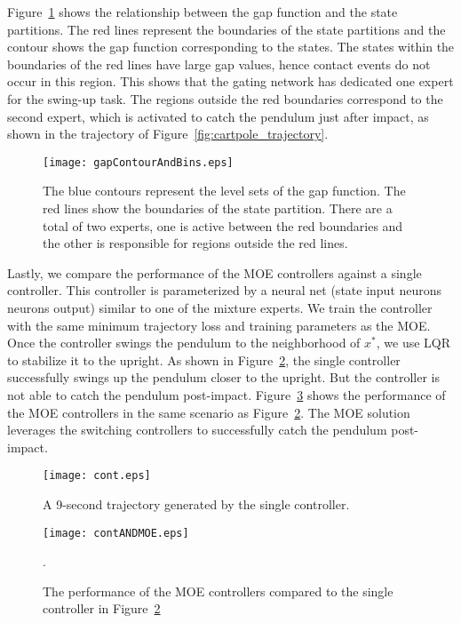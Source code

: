 Figure~\ref{fig:gapContour} shows the relationship between the gap function and the state partitions.
%
The red lines represent the boundaries of the state partitions and the contour
shows the gap function corresponding to the states.
%
The states within the boundaries of the red lines have large gap values, hence
contact events do not occur in this region.
%
This shows that the gating network has dedicated one expert for the swing-up
task.
%
The regions outside the red boundaries correspond to the second expert, which is
activated to catch the pendulum just after impact, as shown in the trajectory of
Figure~\ref{fig:cartpole_trajectory}.


\begin{figure}[H]
    \centering
    \texttt{[image: gapContourAndBins.eps]}
    \caption{The blue contours represent the level sets of the gap function. The red lines show the boundaries of the state partition. There are a total of two experts, one is active between the red boundaries and the other is responsible for regions outside the red lines.}
    \label{fig:gapContour}
\end{figure}


Lastly, we compare the performance of the MOE controllers against a single controller.
%
This controller is parameterized by a neural net (state input 
neurons  neurons  output) similar to one of the
mixture experts.
%
We train the controller with the same minimum trajectory loss and training
parameters as the MOE.
%
Once the controller swings the pendulum to the neighborhood of $x^*$, we use LQR
to stabilize it to the upright.
%
As shown in Figure~\ref{fig:continuous_control}, the single controller
successfully swings up the pendulum closer to the upright.
%
But the controller is not able to catch the pendulum post-impact.
%
Figure~\ref{fig:contandmoe} shows the performance of the MOE controllers in the
same scenario as Figure~\ref{fig:continuous_control}.
%
The MOE solution leverages the switching controllers to successfully catch the
pendulum post-impact.
%

\begin{figure}[t]
    \centering
    \texttt{[image: cont.eps]}
    \caption{A 9-second trajectory generated by the single controller. }
    \label{fig:continuous_control}
\end{figure}

\begin{figure}[H]
    \centering
    \texttt{[image: contANDMOE.eps]}
    \caption{The performance of the MOE controllers compared to the single
    controller in Figure~\ref{fig:continuous_control}}.
    \label{fig:contandmoe}
\end{figure}
